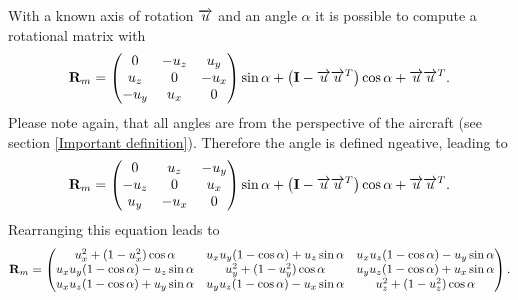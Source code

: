 With a known axis of rotation $\vect u$ and an angle $\alpha$ it is possible to compute a rotational matrix with
\begin{equation}
\mat R_m = \begin{pmatrix}
0 & -u_z & u_y \\
u_z & 0 & -u_x \\
-u_y & u_x & 0
\end{pmatrix} \sin \alpha + \left( \eye - \vect u \transp{\vect u} \right)\cos \alpha +  \vect u \transp{\vect u}.
\end{equation}
Please note again, that all angles are from the perspective of the aircraft (see section \ref{Important definition}). Therefore the angle is defined ngeative, leading to
\begin{equation}
\mat R_m = \begin{pmatrix}
0 & u_z & -u_y \\
-u_z & 0 & u_x \\
u_y & -u_x & 0
\end{pmatrix} \sin \alpha + \left( \eye - \vect u \transp{\vect u} \right)\cos \alpha +  \vect u \transp{\vect u}.
\end{equation}
Rearranging this equation leads to
\begin{equation}
\mat R_m = \begin{pmatrix}
u_x^2+(1-u_x^2)\cos \alpha				& u_xu_y(1-\cos \alpha) + u_z \sin \alpha	& u_xu_z(1-\cos \alpha) - u_y \sin \alpha \\
u_xu_y(1-\cos \alpha) - u_z \sin \alpha	& u_y^2+(1-u_y^2)\cos \alpha				& u_yu_z(1-\cos \alpha) + u_x \sin \alpha \\
u_xu_z(1-\cos \alpha) + u_y \sin \alpha & u_yu_z(1-\cos \alpha) - u_x \sin \alpha	& u_z^2+(1-u_z^2)\cos \alpha
\end{pmatrix}.
\end{equation}
